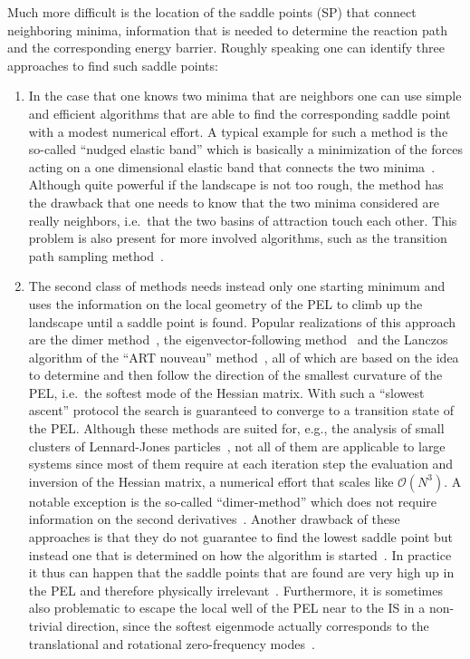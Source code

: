 \documentclass[aip,pre,twocolumn,reprint]{revtex4-1}
\begin{document}
Much more difficult is the location of the saddle points (SP) that connect
neighboring minima, information that is needed to determine the reaction
path and the corresponding energy barrier. Roughly speaking one can
identify three approaches to find such saddle points:

\begin{enumerate}
\item 
In the case that one knows two minima that are neighbors one can use
simple and efficient algorithms that are able to find the corresponding
saddle point with a modest numerical effort. A typical example for such
a method is the so-called ``nudged elastic band'' which is basically a
minimization of the forces acting on a one dimensional elastic band that
connects the two minima~\cite{henkelman2000climbing,henkelman2000improved}. Although quite powerful
if the landscape is not too rough, the method has the drawback that
one needs to know that the two minima considered are really neighbors,
i.e.~that the two basins of attraction touch each other. This problem
is also present for more involved algorithms, such as the transition
path sampling method~\cite{bolhuis_2002}.

\item
The second class of methods needs instead only one starting
minimum and uses the information on the local geometry of
the PEL to climb up the landscape until a saddle point is
found. Popular realizations of this approach are the dimer
method~\cite{henkelman1999dimer,henkelmann_2000}, the eigenvector-following
method~\cite{munro1999defect,wales2003stationary} and the Lanczos
algorithm of the ``ART nouveau'' method~\cite{malek2000dynamics}, all of
which are based on the idea to determine and then follow the direction of
the smallest curvature of the PEL, i.e.~the softest mode of the Hessian
matrix. With such a ``slowest ascent'' protocol the search is guaranteed
to converge to a transition state of the PEL.  Although these methods
are suited for, e.g., the analysis of small clusters of Lennard-Jones
particles~\cite{wales1994rearrangements,doye1999evolution}, not all of
them are applicable to large systems since most of them require at each
iteration step the evaluation and inversion of the Hessian matrix,
a numerical effort that scales like $\mathcal{O}(N^3)$. A notable
exception is the so-called ``dimer-method'' which does not require
information on the second derivatives~\cite{henkelman1999dimer}. Another drawback
of these approaches is that they do not guarantee to find the lowest
saddle point but instead one that is determined on how the algorithm
is started~\cite{doliwa2003energy}. In practice it thus can happen
that the saddle points that are found are very high up in the PEL and
therefore physically irrelevant~\cite{doye2002saddle}. Furthermore, it
is sometimes also problematic to escape the local well of the PEL near
to the IS in a non-trivial direction, since the softest eigenmode
actually corresponds to the translational and rotational zero-frequency
modes~\cite{pedersen2014bowl}.


\end{enumerate}
\end{document}
